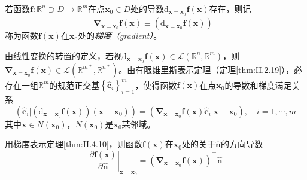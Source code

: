 \documentclass[main.tex]{subfiles}
\begin{document}
\begin{definition}[向量函数的梯度]\label{def:II.4.19}
    若函数$\mathbf{f}:\mathbb{R}^n\supset D\rightarrow\mathbb{R}^m$在点$\mathbf{x}_0\in D$处的导数$\mathrm{d}_{\mathbf{x}=\mathbf{x}_0}\mathbf{f}\left(\mathbf{x}\right)$存在，则记
    \[\mathbf{\nabla}_{\mathbf{x}=\mathbf{x}_0}\mathbf{f}\left(\mathbf{x}\right)\equiv\left(\mathrm{d}_{\mathbf{x}=\mathbf{x}_0}\mathbf{f}\left(\mathbf{x}\right)\right)^\intercal\]
    称为函数$\mathbf{f}\left(\mathbf{x}\right)$在$\mathbf{x}_0$处的\emph{梯度（gradient）}。
\end{definition}

由线性变换的转置的定义，若视$\mathrm{d}_{\mathbf{x}=\mathbf{x}_0}\mathbf{f}\left(\mathbf{x}\right)\in\mathcal{L}\left(\mathbb{R}^n,\mathbb{R}^m\right)$，则$\mathbf{\nabla}_{\mathbf{x}=\mathbf{x}_0}\mathbf{f}\left(\mathbf{x}\right)\in\mathcal{L}\left(\mathbb{R}^{m*},\mathbb{R}^{n*}\right)$。由有限维里斯表示定理（定理\ref{thm:II.2.19}），必存在一组$\mathbb{R}^m$的规范正交基$\left\{\mathbf{\hat{e}}_i\right\}_{i=1}^m$，使得函数$\mathbf{f}\left(\mathbf{x}\right)$在点$\mathbf{x}_0$的导数和梯度满足关系
\[\left(\mathbf{\hat{e}}_i|\left(\mathrm{d}_{\mathbf{x}=\mathbf{x}_0}\mathbf{f}\left(\mathbf{x}\right)\right)\left(\mathbf{x}-\mathbf{x}_0\right)\right)=\left(\mathbf{\nabla}_{\mathbf{x}=\mathbf{x}_0}\mathbf{f}\left(\mathbf{x}\right)\mathbf{\hat{e}}_i|\mathbf{x}-\mathbf{x}_0\right),\quad i=1,\cdots,m\]
其中$\mathbf{x}\in N\left(\mathbf{x}_0\right)$，$N\left(\mathbf{x}_0\right)$是$\mathbf{x}_0$某邻域。

用梯度表示定理\ref{thm:II.4.10}，则函数$\mathbf{f}\left(\mathbf{x}\right)$在$\mathbf{x}_0$处的关于$\mathbf{\hat{n}}$的方向导数
\[\left.\frac{\partial\mathbf{f}\left(\mathbf{x}\right)}{\partial \mathbf{\hat{n}}}\right|_{\mathbf{x}=\mathbf{x}_0}=\left(\mathbf{\nabla}_{\mathbf{x}=\mathbf{x}_0}\mathbf{f}\left(\mathbf{x}\right)\right)^\intercal\mathbf{\hat{n}}\]
\end{document}
